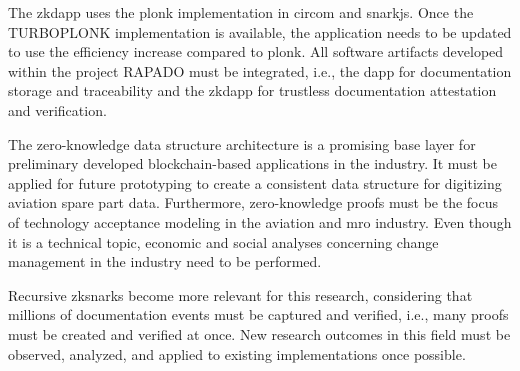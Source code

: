 The \acrshort{zkdapp} uses the \acrshort{plonk} implementation in circom and snarkjs. Once the TURBOPLONK implementation is available, the application needs to be updated to use the efficiency increase compared to \acrshort{plonk}. All software artifacts developed within the project RAPADO must be integrated, i.e., the \acrshort{dapp} for documentation storage and traceability and the \acrshort{zkdapp} for trustless documentation attestation and verification. 

The zero-knowledge data structure architecture is a promising base layer for preliminary developed blockchain-based applications in the industry. It must be applied for future prototyping to create a consistent data structure for digitizing aviation spare part data. Furthermore, zero-knowledge proofs must be the focus of technology acceptance modeling in the aviation and \acrshort{mro} industry. Even though it is a technical topic, economic and social analyses concerning change management in the industry need to be performed. 

Recursive \acrshort{zksnark}s become more relevant for this research, considering that millions of documentation events must be captured and verified, i.e., many proofs must be created and verified at once. New research outcomes in this field must be observed, analyzed, and applied to existing implementations once possible.